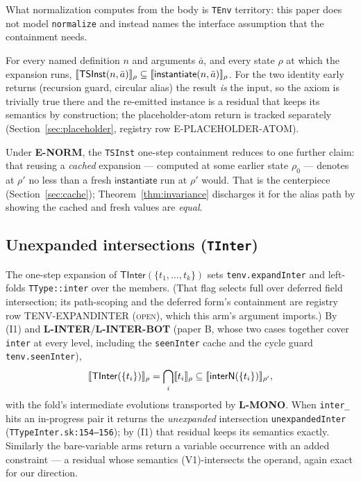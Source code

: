 \documentclass[11pt]{article}
\newcommand{\instop}{\mathsf{instantiate}}
\begin{document}
What normalization computes from the body is \texttt{TEnv} territory:
this paper does not model \texttt{normalize} and instead names the
interface assumption that the containment needs.

\begin{axiom}
\label{ax:enorm}
For every named definition $n$ and arguments $\bar{a}$, and every state
$\rho$ at which the expansion runs,
$\sem{\mathsf{TSInst}(n,\bar{a})}_\rho \subseteq
 \sem{\instop(n,\bar{a})}_\rho$.
For the two identity early returns (recursion guard, circular alias)
the result \emph{is} the input, so the axiom is trivially true there
and the re-emitted instance is a residual that keeps its semantics by
construction; the placeholder-atom return is tracked separately
(Section~\ref{sec:placeholder}, registry row E-PLACEHOLDER-ATOM).
\end{axiom}

Under \textbf{E-NORM}, the \texttt{TSInst} one-step containment reduces
to one further claim: that reusing a \emph{cached} expansion — computed
at some earlier state $\rho_0$ — denotes at $\rho'$ no less than a fresh
$\instop$ run at $\rho'$ would. That is the centerpiece
(Section~\ref{sec:cache}); Theorem~\ref{thm:invariance} discharges it
for the alias path by showing the cached and fresh values are
\emph{equal}.

\subsection{Unexpanded intersections (\texttt{TInter})}
\label{sec:tinter}

The one-step expansion of $\mathsf{TInter}(\{t_1,\dots,t_k\})$ sets
\texttt{tenv.expandInter} and left-folds \texttt{TType::inter} over the
members. (That flag selects full over deferred field intersection; its
path-scoping and the deferred form's containment are registry row
TENV-EXPANDINTER (\textsc{open}), which this arm's argument imports.) By (I1) and
\textbf{L-INTER}/\textbf{L-INTER-BOT} (paper B, whose two cases together cover
\texttt{inter} at every level, including the \texttt{seenInter} cache
and the cycle guard \texttt{tenv.seenInter}),
\[
\llbracket \mathsf{TInter}(\{t_i\}) \rrbracket_\rho = \bigcap_i \llbracket t_i \rrbracket_\rho
\subseteq \llbracket \mathsf{interN}(\{t_i\}) \rrbracket_{\rho'},
\]
with the fold's intermediate evolutions transported by \textbf{L-MONO}.
When \texttt{inter\_} hits an in-progress pair it returns the
\emph{unexpanded} intersection \texttt{unexpandedInter}
(\texttt{TTypeInter.sk:154--156}); by (I1) that residual keeps its
semantics exactly. Similarly the bare-variable arms return a variable
occurrence with an added constraint — a residual whose semantics
(V1)-intersects the operand, again exact for our direction.
\end{document}
